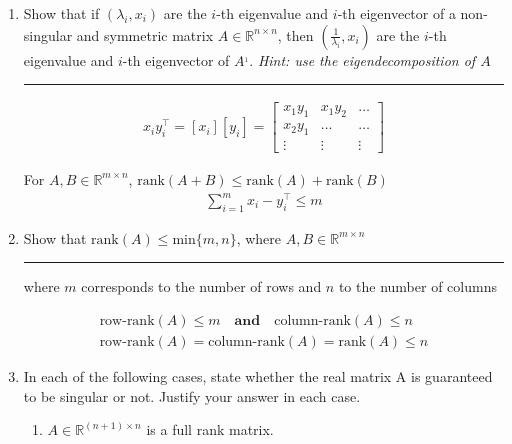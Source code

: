 \documentclass[12pt]{article}
\begin{document}
\begin{enumerate}
    \item Show that if $(\lambda_i, x_i)$ are the $i$-th eigenvalue and $i$-th eigenvector of a non-singular and symmetric matrix 
          $A \in \mathbb{R}^{n \times n}$, then $( \frac{1}{\lambda_i}, x_i)$ are the $i$-th eigenvalue and $i$-th eigenvector of $A^{_1}$.
          \textit{Hint: use the eigendecomposition of $A$}
    
    \noindent\rule{\linewidth}{1pt}

    \begin{align*}
        x_i y_i^\intercal = [x_i][y_i] = 
        \begin{bmatrix}
            x_1 y_1          &   x_1 y_2          &   \dots            \\
            x_2 y_1          &   \dots            &   \dots            \\
            \vdots           &   \vdots           &   \vdots            
        \end{bmatrix}
    \end{align*}
    
    For $A,B \in \mathbb{R}^{m \times n}$, $\textrm{rank}(A+B) \leq \textrm{rank}(A) + \textrm{rank}(B)$
    \begin{align*}
        \sum_{i=1}^m x_i - y_i^\intercal \leq m 
    \end{align*}   

    \item Show that $\textrm{rank}(A) \leq \textrm{min}\{m, n\}$, where $A, B \in \mathbb{R}^{m \times n}$
    
    \noindent\rule{\linewidth}{1pt}

    where $m$ corresponds to the number of rows and $n$ to the number of columns
    
    \begin{align*}
        \textrm{row-rank}(A) \leq m \quad \textbf{and} \quad  \textrm{column-rank}(A) \leq n \\
        \textrm{row-rank}(A) = \textrm{column-rank}(A) = \textrm{rank}(A) \leq n 
    \end{align*}     

    \item In each of the following cases, state whether the real matrix A is guaranteed to be singular or not. Justify your answer in each case.
    
    \begin{enumerate}

        \item  $A \in \mathbb{R}^{(n+1) \times n}$ is a full rank matrix.
        

\end{enumerate}
\end{enumerate}
\end{document}
